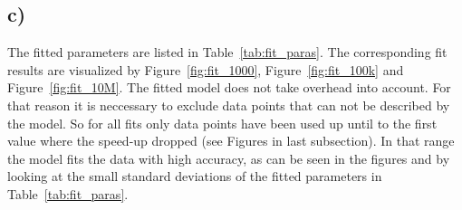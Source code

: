 \documentclass[a4paper, 11pt]{article}
\begin{document}
\FloatBarrier
\subsection*{c)}
The fitted parameters are listed in Table~\ref{tab:fit_paras}. The
corresponding fit results are visualized by Figure~\ref{fig:fit_1000},
Figure~\ref{fig:fit_100k} and Figure~\ref{fig:fit_10M}. The fitted model does
not take overhead into account. For that reason it is neccessary to exclude
data points that can not be described by the model. So for all fits only data
points have been used up until to the first value where the speed-up dropped
(see Figures in last subsection). In that range the model fits the data with
high accuracy, as can be seen in the figures and by looking at the small
standard deviations of the fitted parameters in Table~\ref{tab:fit_paras}.
 
\end{document}
